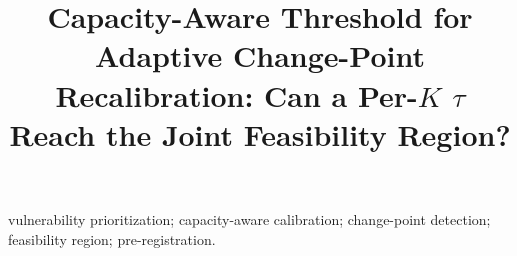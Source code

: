 \documentclass[journal]{IEEEtran}
\title{Capacity-Aware Threshold for Adaptive Change-Point
Recalibration: Can a Per-$K$ $\tau$ Reach the Joint Feasibility Region?}
\author{%
  \IEEEauthorblockN{Harshavardhan Malla}
  \IEEEauthorblockA{Independent Researcher\\
  Harshavardhanmalla75@gmail.com}%
}
\begin{document}
\maketitle

\begin{abstract}

\end{abstract}

\begin{IEEEkeywords}
vulnerability prioritization; capacity-aware calibration; change-point
detection; feasibility region; pre-registration.
\end{IEEEkeywords}















\end{document}
